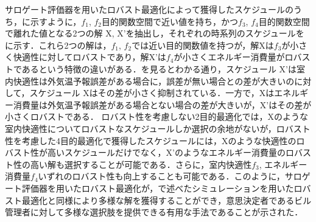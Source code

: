 サロゲート評価器を用いたロバスト最適化によって獲得したスケジュールのうち，に示すように，$f_1$, $f_2$目的関数空間で近い値を持ち，かつ$f_3$, $f_4$目的関数空間で離れた値となる2つの解 X, X'を抽出し，それぞれの時系列のスケジュールをに示す．これら2つの解は，$f_1$, $f_2$では近い目的関数値を持つが，解Xは$f_3$が小さく快適性に対してロバストであり，解X'は$f_4$が小さくエネルギー消費量がロバストであるという特徴の違いがある．を見るとわかる通り，スケジュール X'は室内快適性は外気温予報誤差がある場合に，誤差が無い場合との差が大きいのに対して，スケジュール Xはその差が小さく抑制されている．一方で，Xはエネルギー消費量は外気温予報誤差がある場合とない場合の差が大きいが，X'はその差が小さくロバストである．
ロバスト性を考慮しない2目的最適化では，Xのような室内快適性についてロバストなスケジュールしか選択の余地がないが，ロバスト性を考慮した4目的最適化で獲得したスケジュールには，Xのような快適性のロバスト性が高いスケジュールだけでなく，X'のようなエネルギー消費量のロバスト性の高い解も選択することが可能である．さらに，室内快適性$f_3$, エネルギー消費量$f_4$いずれのロバスト性も向上することも可能である．このように，サロゲート評価器を用いたロバスト最適化が，で述べたシミュレーションを用いたロバスト最適化と同様により多様な解を獲得することができ，意思決定者であるビル管理者に対して多様な選択肢を提供できる有用な手法であることが示された．

